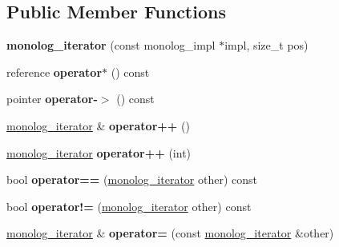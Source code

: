 \subsection*{Public Member Functions}
\begin{DoxyCompactItemize}
\item 
\mbox{\label{classdialog_1_1monolog_1_1monolog__iterator_a889db1621e11a5779674461c63afc43f}} 
{\bfseries monolog\+\_\+iterator} (const monolog\+\_\+impl $\ast$impl, size\+\_\+t pos)
\item 
\mbox{\label{classdialog_1_1monolog_1_1monolog__iterator_ae4c69a3fba206599055287abba1ee29f}} 
reference {\bfseries operator$\ast$} () const
\item 
\mbox{\label{classdialog_1_1monolog_1_1monolog__iterator_ac4786a3cd9b8a2b418d4e24d37374938}} 
pointer {\bfseries operator-\/$>$} () const
\item 
\mbox{\label{classdialog_1_1monolog_1_1monolog__iterator_a11b03414f73b0805aaecddfb9af28819}} 
\hyperlink{classdialog_1_1monolog_1_1monolog__iterator}{monolog\+\_\+iterator} \& {\bfseries operator++} ()
\item 
\mbox{\label{classdialog_1_1monolog_1_1monolog__iterator_ab3eb2c7f0297bfd7b3a06a7136879e51}} 
\hyperlink{classdialog_1_1monolog_1_1monolog__iterator}{monolog\+\_\+iterator} {\bfseries operator++} (int)
\item 
\mbox{\label{classdialog_1_1monolog_1_1monolog__iterator_a492c37ede0dc453baa10d7117294c960}} 
bool {\bfseries operator==} (\hyperlink{classdialog_1_1monolog_1_1monolog__iterator}{monolog\+\_\+iterator} other) const
\item 
\mbox{\label{classdialog_1_1monolog_1_1monolog__iterator_a5d3c1f7726755d6401e47c73eb79d84f}} 
bool {\bfseries operator!=} (\hyperlink{classdialog_1_1monolog_1_1monolog__iterator}{monolog\+\_\+iterator} other) const
\item 
\mbox{\label{classdialog_1_1monolog_1_1monolog__iterator_a9062af90996e2d38b005017b2d7f3183}} 
\hyperlink{classdialog_1_1monolog_1_1monolog__iterator}{monolog\+\_\+iterator} \& {\bfseries operator=} (const \hyperlink{classdialog_1_1monolog_1_1monolog__iterator}{monolog\+\_\+iterator} \&other)
\end{DoxyCompactItemize}



